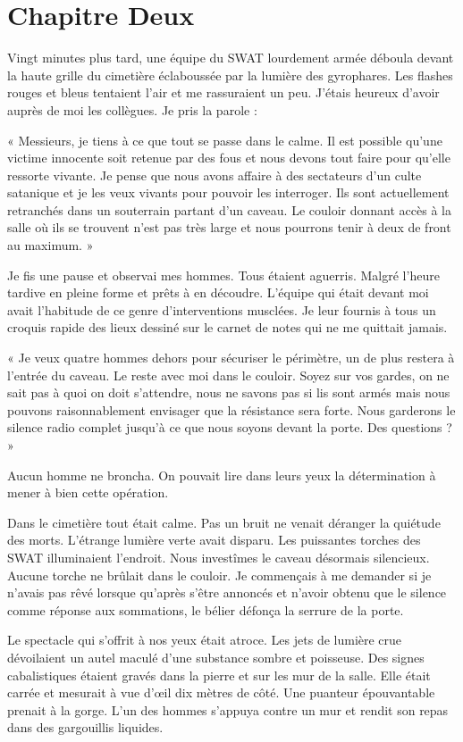 \chapter[Chapitre Deux]{Chapitre Deux}
Vingt minutes plus tard, une équipe du SWAT lourdement armée déboula devant la haute grille du cimetière éclaboussée 
par la lumière des gyrophares. Les flashes rouges et bleus tentaient l'air et me rassuraient un peu. J'étais heureux 
d'avoir auprès de moi les collègues. Je pris la parole :

« Messieurs, je tiens à ce que tout se passe dans le calme. Il est possible qu'une victime innocente soit retenue par 
des fous et nous devons tout faire pour qu'elle ressorte vivante. Je pense que nous avons affaire à des sectateurs d'un 
culte satanique et je les veux vivants pour pouvoir les interroger. Ils sont actuellement retranchés dans un souterrain 
partant d'un caveau. Le couloir donnant accès à la salle où ils se trouvent n'est pas très large et nous pourrons tenir 
à deux de front au maximum. »

Je fis une pause et observai mes hommes. Tous étaient aguerris. Malgré l'heure tardive en pleine forme et prêts à en 
découdre. L'équipe qui était devant moi avait l'habitude de ce genre d'interventions musclées. Je leur fournis à tous 
un croquis rapide des lieux dessiné sur le carnet de notes qui ne me quittait jamais.

« Je veux quatre hommes dehors pour sécuriser le périmètre, un de plus restera à l'entrée du caveau. Le reste avec moi 
dans le couloir. Soyez sur vos gardes, on ne sait pas à quoi on doit s'attendre, nous ne savons pas si lis sont armés 
mais nous pouvons raisonnablement envisager que la résistance sera forte. Nous garderons le silence radio complet 
jusqu'à ce que nous soyons devant la porte. Des questions ? »

Aucun homme ne broncha. On pouvait lire dans leurs yeux la détermination à mener à bien cette opération.

Dans le cimetière tout était calme. Pas un bruit ne venait déranger la quiétude des morts. L'étrange lumière verte 
avait disparu. Les puissantes torches des SWAT illuminaient l'endroit. Nous investîmes le caveau désormais silencieux. 
Aucune torche ne brûlait dans le couloir. Je commençais à me demander si je n'avais pas rêvé lorsque qu'après s'être 
annoncés et n'avoir obtenu que le silence comme réponse aux sommations, le bélier défonça la serrure de la porte.

Le spectacle qui s'offrit à nos yeux était atroce. Les jets de lumière crue dévoilaient un autel maculé d'une substance 
sombre et poisseuse. Des signes cabalistiques étaient gravés dans la pierre et sur les mur de la salle. Elle était 
carrée et mesurait à vue d'œil dix mètres de côté. Une puanteur épouvantable prenait à la gorge. L'un des hommes 
s'appuya contre un mur et rendit son repas dans des gargouillis liquides.

